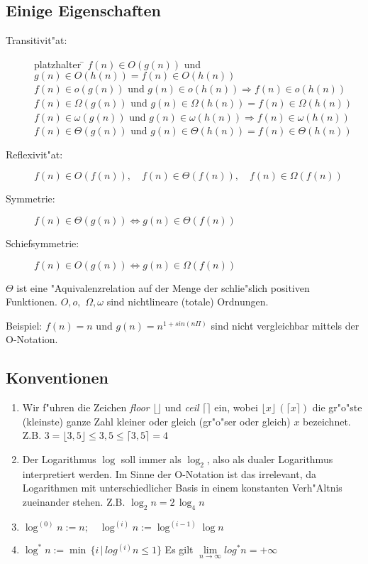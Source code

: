 \documentclass[draft,12pt]{scrreprt}
\theoremstyle{break}
\begin{document}
\subsection{Einige Eigenschaften}
\begin{description}
\item[Transitivit"at:]
\begin{tabbing}
platzhalter \= \kill
        \> $f(n) \in O(g(n))$ und $g(n) \in O(h(n))=f(n) \in O(h(n))$\\
        \> $f(n) \in o(g(n))$ und $g(n) \in o(h(n)) \Rightarrow f(n) \in o(h(n))$\\
        \> $f(n) \in \Omega(g(n))$ und $g(n) \in \Omega(h(n))=f(n) \in \Omega(h(n))$\\
        \> $f(n) \in \omega(g(n))$ und $g(n) \in \omega(h(n)) \Rightarrow f(n) \in \omega(h(n))$\\
        \> $f(n) \in \Theta(g(n))$ und $g(n) \in \Theta(h(n))=f(n) \in \Theta(h(n))$
\end{tabbing}
\item[Reflexivit"at:]
        $f(n) \in O(f(n)), \quad f(n) \in \Theta(f(n)), \quad f(n) \in \Omega(f(n))$
\item[Symmetrie:]
        $f(n) \in \Theta(g(n)) \Leftrightarrow g(n) \in \Theta(f(n))$
\item[Schiefsymmetrie:]
        $f(n) \in O(g(n)) \Leftrightarrow g(n) \in \Omega(f(n))$
\end{description}
$\Theta$ ist eine "Aquivalenzrelation auf der Menge der schlie"slich positiven Funktionen.
$O,o,$ $\Omega,\omega$ sind nichtlineare (totale) Ordnungen.

Beispiel: $f(n)=n$ und $g(n)=n^{1+sin(n\Pi)}$ sind nicht vergleichbar mittels der O-Notation.

\subsection{Konventionen}
\begin{enumerate}
\item   Wir f"uhren die Zeichen \emph{floor} $ \lfloor \rfloor$ und \emph{ceil} $\lceil \rceil$ ein,
        wobei $\lfloor x \rfloor \, ( \lceil x \rceil)$ die gr"o"ste (kleinste) ganze Zahl kleiner oder gleich
        (gr"o"ser oder gleich) $x$ bezeichnet. Z.B. $3=\lfloor 3,5\rfloor \leq 3,5 \leq \lceil 3,5 \rceil=4$
\item   Der Logarithmus $\log$ soll immer als $\log_2$, also als dualer Logarithmus interpretiert werden. Im Sinne der O-Notation ist das
irrelevant, da Logarithmen mit unterschiedlicher Basis in einem konstanten Verh"Altnis zueinander stehen. Z.B. $\log_2 n = 2 \, \log_4 n$
\item   $\log^{(0)}n := n; \quad \log^{(i)}n := \log^{(i-1)}\log n$
\item   $\log^{*}n := \min \, \{i \, | \, log^{(i)}n \leq1 \}$ Es gilt $ \lim\limits_{n \rightarrow \infty}{log^{*}n} = + \infty$
\end{enumerate}
\end{document}
